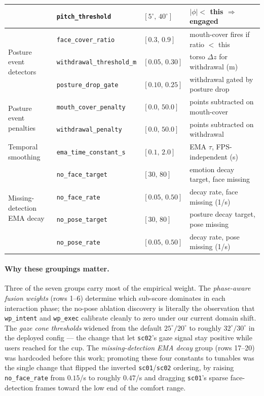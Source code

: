 \documentclass[11pt]{article}
\begin{document}
\begin{table}[h]
\begin{tabular}{l l l l}
  & \texttt{pitch\_threshold}      & $[5^\circ,\,40^\circ]$  & $|\phi| < $ this $\Rightarrow$ engaged \\
\midrule
\multirow{3}{*}{\parbox{2.5cm}{Posture event\\detectors}}
  & \texttt{face\_cover\_ratio}    & $[0.3,\,0.9]$ & mouth-cover fires if ratio $<$ this \\
  & \texttt{withdrawal\_threshold\_m} & $[0.05,\,0.30]$ & torso $\Delta z$ for withdrawal (m) \\
  & \texttt{posture\_drop\_gate}   & $[0.10,\,0.25]$ & withdrawal gated by posture drop \\
\midrule
\multirow{2}{*}{\parbox{2.5cm}{Posture event\\penalties}}
  & \texttt{mouth\_cover\_penalty} & $[0.0,\,50.0]$ & points subtracted on mouth-cover \\
  & \texttt{withdrawal\_penalty}   & $[0.0,\,50.0]$ & points subtracted on withdrawal \\
\midrule
\multirow{1}{*}{\parbox{2.5cm}{Temporal\\smoothing}}
  & \texttt{ema\_time\_constant\_s} & $[0.1,\,2.0]$ & EMA $\tau$, FPS-independent (s) \\
\midrule
\multirow{4}{*}{\parbox{2.5cm}{Missing-detection\\EMA decay}}
  & \texttt{no\_face\_target}      & $[30,\,80]$   & emotion decay target, face missing \\
  & \texttt{no\_face\_rate}        & $[0.05,\,0.50]$ & decay rate, face missing (1/s) \\
  & \texttt{no\_pose\_target}      & $[30,\,80]$   & posture decay target, pose missing \\
  & \texttt{no\_pose\_rate}        & $[0.05,\,0.50]$ & decay rate, pose missing (1/s) \\
\bottomrule
\end{tabular}
\end{table}

\paragraph{Why these groupings matter.}
Three of the seven groups carry most of the empirical weight. The
\emph{phase-aware fusion weights} (rows 1--6) determine which sub-score
dominates in each interaction phase; the no-pose ablation discovery is
literally the observation that \texttt{wp\_intent} and \texttt{wp\_exec}
calibrate cleanly to zero under our current domain shift. The
\emph{gaze cone thresholds} widened from the default $25^\circ/20^\circ$ to roughly
$32^\circ/30^\circ$ in the deployed config --- the change that let \texttt{sc02}'s
gaze signal stay positive while users reached for the cup. The
\emph{missing-detection EMA decay} group (rows 17--20) was hardcoded
before this work; promoting these four constants to tunables was the
single change that flipped the inverted \texttt{sc01}/\texttt{sc02}
ordering, by raising \texttt{no\_face\_rate} from $0.15$/s to roughly
$0.47$/s and dragging \texttt{sc01}'s sparse face-detection frames toward
the low end of the comfort range.
\end{document}
